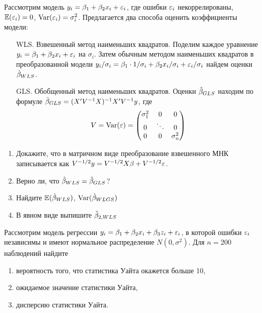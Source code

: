 \documentclass[pdftex,11pt,openany]{book}\usepackage[]{graphicx}\usepackage[]{color}
\begin{document}
\begin{problem}
Рассмотрим модель $y_i=\beta_1+\beta_2 x_i+\varepsilon_i$, где ошибки $\varepsilon_i$ некоррелированы, $\mathbb{E}(\varepsilon_i)=0$, $\operatorname{Var}(\varepsilon_i)=\sigma^2_i$. Предлагается два способа оценить коэффициенты модели:
\begin{enumerate}
\item[WLS.] Взвешенный метод наименьших квадратов. Поделим каждое уравнение $y_i=\beta_1+\beta_2 x_i+\varepsilon_i$ на $\sigma_i$. Затем обычным методом наименьших квадратов в преобразованной модели $y_i/\sigma_i=\beta_1\cdot 1/\sigma_i+\beta_2 x_i/\sigma_i+\varepsilon_i/\sigma_i$ найдем оценки $\hat{\beta}_{WLS}$.
\item[GLS.] Обобщенный метод наименьших квадратов. Оценки $\hat{\beta}_{GLS}$ находим по формуле $\hat{\beta}_{GLS}=(X'V^{-1}X)^{-1}X'V^{-1}y$, где 
\[
V=\operatorname{Var}(\varepsilon)=\begin{pmatrix}
\sigma^2_1 & 0 & 0 \\
0 & \ddots & 0 \\
0 & 0 & \sigma^2_n 
\end{pmatrix}
\]
\end{enumerate}
\begin{enumerate}
\item Докажите, что в матричном виде преобразование взвешенного МНК записывается как $V^{-1/2}y=V^{-1/2}X\beta+V^{-1/2}\varepsilon$.
\item Верно ли, что $\hat{\beta}_{WLS}=\hat{\beta}_{GLS}$?
\item Найдите $\mathbb{E}(\hat{\beta}_{WLS})$, $\operatorname{Var}(\hat{\beta}_{WLGS})$
\item В явном виде выпишите $\hat{\beta}_{2,WLS}$
\end{enumerate}
\end{problem}

\begin{solution}
\end{solution}



\begin{problem}
Рассмотрим модель регрессии $y_i=\beta_1+\beta_2 x_i + \beta_3 z_i+\varepsilon_i$, в которой
ошибки $\varepsilon_i$ независимы и имеют нормальное распределение $N(0,\sigma^2)$. Для $n = 200$ наблюдений найдите
\begin{enumerate}
\item вероятность того, что статистика Уайта окажется больше 10,
\item ожидаемое значение статистики Уайта,
\item дисперсию статистики Уайта.   
\end{enumerate}
\end{problem}
\end{document}
